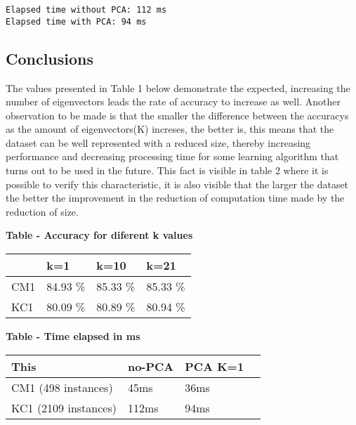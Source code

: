 \documentclass[11pt]{article}
\begin{document}
    \begin{Verbatim}[commandchars=\\\{\}]
Elapsed time without PCA: 112 ms
Elapsed time with PCA: 94 ms

    \end{Verbatim}

    \subsection{Conclusions}\label{conclusions}

    The values presented in Table 1 below demonstrate the expected,
increasing the number of eigenvectors leads the rate of accuracy to
increase as well. Another observation to be made is that the smaller the
difference between the accuracys as the amount of eigenvectors(K)
increses, the better is, this means that the dataset can be well
represented with a reduced size, thereby increasing performance and
decreasing processing time for some learning algorithm that turns out to
be used in the future. This fact is visible in table 2 where it is
possible to verify this characteristic, it is also visible that the
larger the dataset the better the improvement in the reduction of
computation time made by the reduction of size.

    \textbf{Table - Accuracy for diferent k values}

\begin{longtable}[c]{@{}llll@{}}
\toprule
& k=1 & k=10 & k=21\tabularnewline
\midrule
\endhead
CM1 & 84.93 \% & 85.33 \% & 85.33 \%\tabularnewline
KC1 & 80.09 \% & 80.89 \% & 80.94 \%\tabularnewline
\bottomrule
\end{longtable}

\textbf{Table - Time elapsed in ms}

\begin{longtable}[c]{@{}llll@{}}
\toprule
This & no-PCA & PCA K=1\tabularnewline
\midrule
\endhead
CM1 (498 instances) & 45ms & 36ms\tabularnewline
KC1 (2109 instances) & 112ms & 94ms\tabularnewline
\bottomrule
\end{longtable}


    
    
    
    
\end{document}
